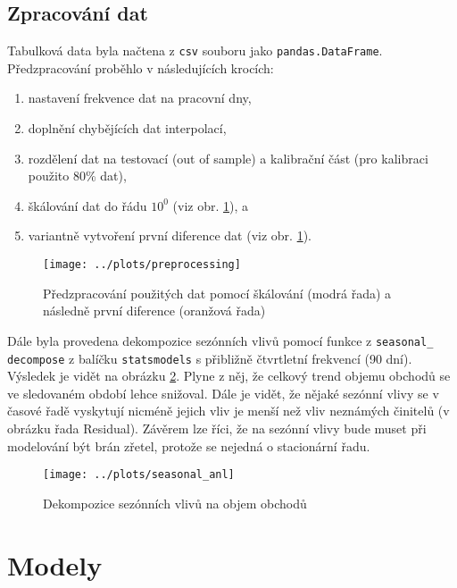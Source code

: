 \documentclass[a4paper,12pt, czech]{article}
\newcommand{\code}[1]{\texttt{#1}}
\begin{document}
\subsection{Zpracování dat}

Tabulková data byla načtena z \code{csv} souboru jako \code{pandas.DataFrame}.
Předzpracování proběhlo v následujících krocích:

\begin{enumerate}
	\item nastavení frekvence dat na pracovní dny,
	\item doplnění chybějících dat interpolací,
	\item rozdělení dat na testovací (out of sample) a kalibrační část (pro kalibraci použito 80\% dat),
	\item škálování dat do řádu $10^0$ (viz obr. \ref{fig:preprocess}), a
	\item variantně vytvoření první diference dat (viz obr. \ref{fig:preprocess}).
\end{enumerate}

\begin{figure}[htbp]
	\centering
	\texttt{[image: ../plots/preprocessing]}
	\caption{Předzpracování použitých dat pomocí škálování (modrá řada) a následně první diference (oranžová řada)}
	\label{fig:preprocess}
\end{figure}

Dále byla provedena dekompozice sezónních vlivů pomocí funkce z \code{seasonal\_} \code{decompose} z balíčku \code{statsmodels} s přibližně čtvrtletní frekvencí (90 dní).
Výsledek je vidět na obrázku \ref{fig:seasonal_anl}.
Plyne z něj, že celkový trend objemu obchodů se ve sledovaném období lehce snižoval.
Dále je vidět, že nějaké sezónní vlivy se v časové řadě vyskytují nicméně jejich vliv je menší než vliv neznámých činitelů (v obrázku řada Residual).
Závěrem lze říci, že na sezónní vlivy bude muset při modelování být brán zřetel, protože se nejedná o stacionární řadu.

\begin{figure}[htbp]
	\centering
	\texttt{[image: ../plots/seasonal\_anl]}
	\caption{Dekompozice sezónních vlivů na objem obchodů}
	\label{fig:seasonal_anl}
\end{figure}


\section{Modely}
\end{document}
